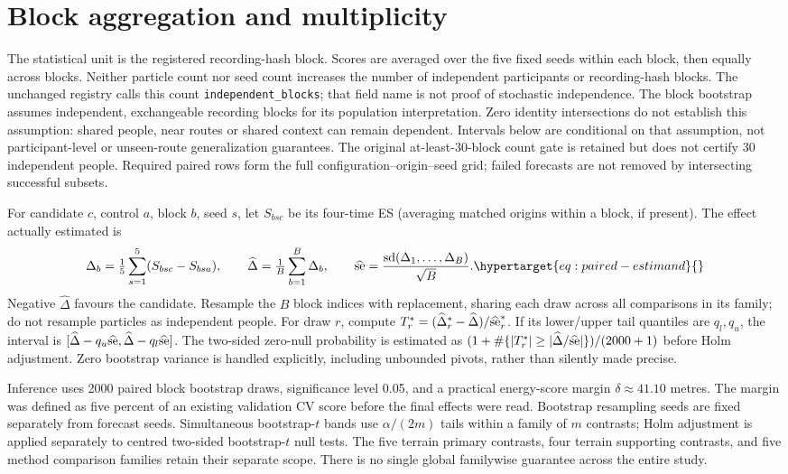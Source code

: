 \section{Block aggregation and multiplicity}
The statistical unit is the registered recording-hash block. Scores are averaged
over the five fixed seeds within each block, then equally across blocks.
Neither particle count nor seed count increases the number of independent
participants or recording-hash blocks. The unchanged registry calls this
count \texttt{independent\_blocks}; that field name is not proof of stochastic
independence. The block bootstrap assumes independent, exchangeable
recording blocks for its population interpretation. Zero identity intersections
do not establish this assumption: shared people, near routes or shared context
can remain dependent. Intervals below are conditional on that assumption,
not participant-level or unseen-route generalization guarantees. The original
at-least-30-block count gate is retained but does not certify 30 independent
people. Required paired rows form the full configuration--origin--seed grid;
failed forecasts are not removed by intersecting successful subsets.

For candidate \(c\), control \(a\), block \(b\), seed \(s\), let
\(S_{bsc}\) be its four-time ES (averaging matched origins within a block,
if present). The effect actually estimated is
\begin{equation}
 \Delta_b=\tfrac15\sum_{s=1}^5(S_{bsc}-S_{bsa}),\qquad
 \widehat\Delta=\tfrac1{B}\sum_{b=1}^{B}\Delta_b,\qquad
 \widehat{\rm se}=\frac{{\rm sd}(\Delta_1,\ldots,\Delta_B)}{\sqrt B}.
 \label{eq:paired-estimand}\hypertarget{eq:paired-estimand}{}
\end{equation}
Negative \(\widehat\Delta\) favours the candidate. Resample the \(B\) block
indices with replacement, sharing each draw across all comparisons in its
family; do not resample particles as independent people.
For draw \(r\), compute \(T_r^*=(\widehat\Delta_r^*-\widehat\Delta)/
\widehat{\rm se}_r^*\). If its lower/upper tail quantiles are \(q_l,q_u\),
the interval is
\([\widehat\Delta-q_u\widehat{\rm se},\widehat\Delta-q_l\widehat{\rm se}]\).
The two-sided zero-null probability is estimated as
\((1+\#\{|T_r^*|\geq|\widehat\Delta/\widehat{\rm se}|\})/(2000+1)\)
before Holm adjustment. Zero bootstrap variance is handled explicitly,
including unbounded pivots, rather than silently made precise.

Inference uses 2000 paired block bootstrap draws, significance level 0.05,
and a practical energy-score margin \(\delta\approx41.10\) metres. The margin
was defined as five percent of an existing validation CV score before
the final effects were read. Bootstrap resampling seeds are fixed separately
from forecast seeds. Simultaneous bootstrap-\(t\) bands use
\(\alpha/(2m)\) tails within a family of \(m\) contrasts; Holm adjustment
is applied separately to centred two-sided bootstrap-\(t\) null tests.
The five terrain primary contrasts, four terrain supporting contrasts, and
five method comparison families retain their separate scope. There is no
single global familywise guarantee across the entire study.

